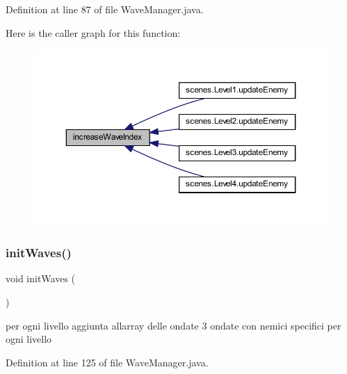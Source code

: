 Definition at line 87 of file Wave\+Manager.\+java.

Here is the caller graph for this function\+:\nopagebreak
\begin{figure}[H]
\begin{center}
\leavevmode
\includegraphics[width=350pt]{classmanagers_1_1_wave_manager_a30f46b71db254d0e9ca9e7f3578134c3_icgraph}
\end{center}
\end{figure}
\mbox{\label{classmanagers_1_1_wave_manager_a6df6e01cd643c513c52431c1a86819af}} 
\subsubsection{\texorpdfstring{init\+Waves()}{initWaves()}}
{\footnotesize\ttfamily void init\+Waves (\begin{DoxyParamCaption}{ }\end{DoxyParamCaption})\hspace{0.3cm}{\ttfamily [private]}}



per ogni livello aggiunta all\textquotesingle{}array delle ondate 3 ondate con nemici specifici per ogni livello 



Definition at line 125 of file Wave\+Manager.\+java.

